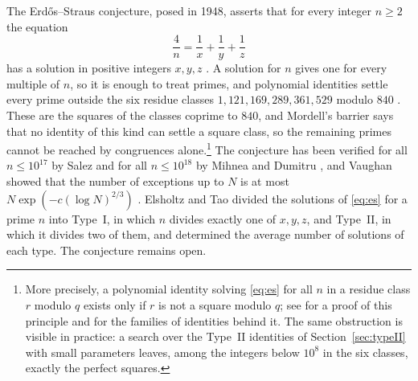 \documentclass{amsart}
\theoremstyle{definition}
\theoremstyle{remark}
\numberwithin{equation}{section}
\begin{document}
The Erd\H{o}s--Straus conjecture, posed in 1948, asserts that for every integer $n\ge2$ the equation
\begin{equation}\label{eq:es}
\frac4n=\frac1x+\frac1y+\frac1z
\end{equation}
has a solution in positive integers $x,y,z$ \cite[\S D11]{Guy}. A solution for $n$ gives one for every multiple of $n$, so it is enough to treat primes, and polynomial identities settle every prime outside the six residue classes $1,121,169,289,361,529$ modulo $840$ \cite{Mor}. These are the squares of the classes coprime to $840$, and Mordell's barrier says that no identity of this kind can settle a square class, so the remaining primes cannot be reached by congruences alone.\footnote{More precisely, a polynomial identity solving \eqref{eq:es} for all $n$ in a residue class $r$ modulo $q$ exists only if $r$ is not a square modulo $q$; see \cite[Section~2]{ET} for a proof of this principle and for the families of identities behind it. The same obstruction is visible in practice: a search over the Type~II identities of Section~\ref{sec:typeII} with small parameters leaves, among the integers below $10^8$ in the six classes, exactly the perfect squares.} The conjecture has been verified for all $n\le10^{17}$ by Salez \cite{Sal} and for all $n\le10^{18}$ by Mihnea and Dumitru \cite{MD}, and Vaughan showed that the number of exceptions up to $N$ is at most $N\exp(-c(\log N)^{2/3})$ \cite{Vau}. Elsholtz and Tao \cite{ET} divided the solutions of \eqref{eq:es} for a prime $n$ into Type~I, in which $n$ divides exactly one of $x,y,z$, and Type~II, in which it divides two of them, and determined the average number of solutions of each type. The conjecture remains open.
\end{document}
